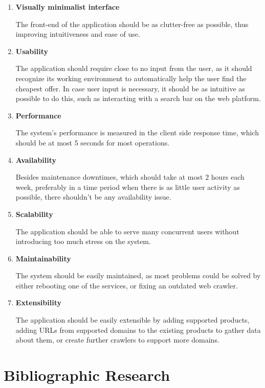 \documentclass[12pt,a4paper,twoside]{report}
\begin{document}
\begin{enumerate}
  \item \textbf{Visually minimalist interface}

        The front-end of the application should be as clutter-free as possible, thus improving intuitiveness and ease of use.

  \item \textbf{Usability}

        The application should require close to no input from the user, as it should recognize its working environment to automatically help the user find the cheapest offer. In case user input is necessary, it should be as intuitive as possible to do this, such as interacting with a search bar on the web platform.

  \item \textbf{Performance}

        The system’s performance is measured in the client side response time, which should be at most 5 seconds for most operations.

  \item \textbf{Availability}

        Besides maintenance downtimes, which should take at most 2 hours each week, preferably in a time period when there is as little user activity as possible, there shouldn’t be any availability issue.

  \item \textbf{Scalability}

        The application should be able to serve many concurrent users without introducing too much stress on the system.

  \item \textbf{Maintainability}

        The system should be easily maintained, as most problems could be solved by either rebooting one of the services, or fixing an outdated web crawler.

  \item \textbf{Extensibility}

        The application should be easily extensible by adding supported products, adding URLs from supported domains to the existing products to gather data about them, or create further crawlers to support more domains.

\end{enumerate}


\chapter{Bibliographic Research}
\end{document}
